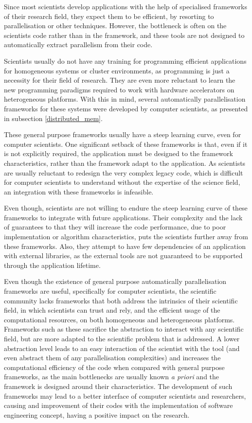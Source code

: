 Since most scientists develop applications with the help of specialised frameworks of their research field, they expect them to be efficient, by resorting to parallelisation or other techniques. However, the bottleneck is often on the scientists code rather than in the framework, and these tools are not designed to automatically extract parallelism from their code.

Scientists usually do not have any training for programming efficient applications for homogeneous systems or cluster environments, as programming is just a necessity for their field of research. They are even more reluctant to learn the new programming paradigms required to work with hardware accelerators on heterogeneous platforms. With this in mind, several automatically parallelisation frameworks for these systems were developed by computer scientists, as presented in subsection \ref{distributed_mem}.

These general purpose frameworks usually have a steep learning curve, even for computer scientists. One significant setback of these frameworks is that, even if it is not explicitly required, the application must be designed to the framework characteristics, rather than the framework adapt to the application. As scientists are usually reluctant to redesign the very complex legacy code, which is difficult for computer scientists to understand without the expertise of the science field, an integration with these frameworks is infeasible.

Even though, scientists are not willing to endure the steep learning curve of these frameworks to integrate with future applications. Their complexity and the lack of guarantees to that they will increase the code performance, due to poor implementation or algorithm characteristics, puts the scientists further away from these frameworks. Also, they attempt to have few dependencies of an application with external libraries, as the external tools are not guaranteed to be supported through the application lifetime.

Even though the existence of general purpose automatically parallelisation frameworks are useful, specifically for computer scientists, the scientific community lacks frameworks that both address the intrinsics of their scientific field, in which scientists can trust and rely, and the efficient usage of the computational resources, on both homogeneous and heterogeneous platforms. Frameworks such as these sacrifice the abstraction to interact with any scientific field, but are more adapted to the scientific problem that is addressed. A lower abstraction level leads to an easy interaction of the scientist with the tool (and even abstract them of any parallelisation complexities) and increases the computational efficiency of the code when compared with general purpose frameworks, as the main bottlenecks are usually known \textit{a priori} and the framework is designed around their characteristics. The development of such frameworks may lead to a better interface of computer scientists and researchers, causing and improvement of their codes with the implementation of software engineering concept, having a positive impact on the research.

